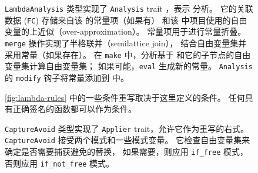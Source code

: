 \begin{figure}
{%
\texttt{LambdaAnalysis} 类型实现了 \texttt{Analysis} trait
  ，表示 \eclass 分析。 %
它的关联数据 (\texttt{FC}) 存储来自该 \eclass 的常量项（如果有）
  和该 \eclass 中项目使用的自由变量的上近似（over-approximation）。
常量项用于进行常量折叠。
\texttt{merge} 操作实现了半格联并（semilattice join），
  结合自由变量集并采用常量（如果存在）。
在 \texttt{make} 中，分析基于 \enode 和它的子节点的自由变量集计算自由变量集；
  如果可能，\texttt{eval} 生成新的常量。
\texttt{Analysis} 的 \texttt{modify} 钩子将常量添加到 \egraph 中。


\autoref{fig:lambda-rules} 中的一些条件重写取决于这里定义的条件。
任何具有正确签名的函数都可以作为条件。

\texttt{CaptureAvoid} 类型实现了 \texttt{Applier} trait，允许它作为重写的右式。
\texttt{CaptureAvoid} 接受两个模式和一些模式变量。
它检查自由变量集来确定是否需要捕获避免的替换，
  如果需要，则应用 \texttt{if\_free} 模式，
  否则应用 \texttt{if\_not\_free} 模式。
}
\label{fig:lambda-applier}
\label{fig:lambda-analysis}
\end{figure}


